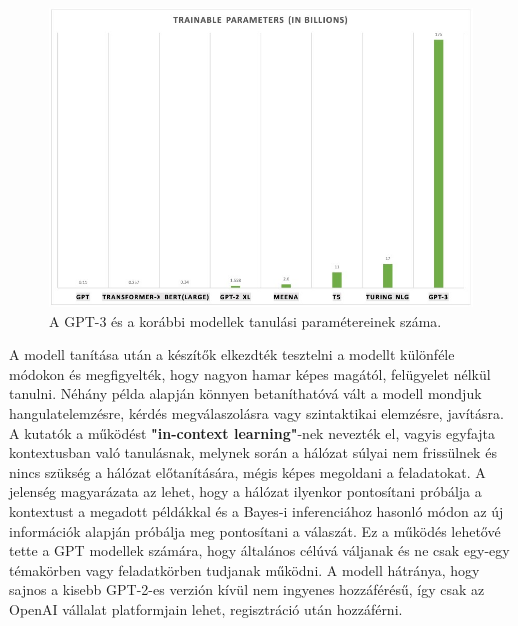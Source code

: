 \newpage

\begin{figure}[h]
\centering
\includegraphics[scale=0.5]{images/gpt_trainable_params.png}
\caption{A GPT-3 és a korábbi modellek tanulási paramétereinek száma.}
\label{fig:gpt_tp}
\end{figure}

A modell tanítása után a készítők elkezdték tesztelni a modellt különféle módokon és megfigyelték, hogy nagyon hamar képes magától, felügyelet nélkül tanulni. Néhány példa alapján könnyen betaníthatóvá vált a modell mondjuk hangulatelemzésre, kérdés megválaszolásra vagy szintaktikai elemzésre, javításra. A kutatók a működést \textbf{"in-context learning"}-nek nevezték el\cite{gpt}, vagyis egyfajta kontextusban való tanulásnak, melynek során a hálózat súlyai nem frissülnek és nincs szükség a hálózat előtanítására, mégis képes megoldani a feladatokat. A jelenség magyarázata az lehet, hogy a hálózat ilyenkor pontosítani próbálja a kontextust a megadott példákkal és a Bayes-i inferenciához hasonló módon az új információk alapján próbálja meg pontosítani a válaszát.\cite{in_context_learning} Ez a működés lehetővé tette a GPT modellek számára, hogy általános célúvá váljanak és ne csak egy-egy témakörben vagy feladatkörben tudjanak működni. A modell hátránya, hogy sajnos a kisebb GPT-2-es verzión kívül nem ingyenes hozzáférésű, így csak az OpenAI vállalat platformjain lehet, regisztráció után hozzáférni.


